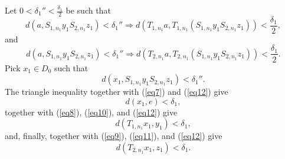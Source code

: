 \documentclass[12pt,a4paper]{amsart}
\theoremstyle{plain}
\theoremstyle{definition}
\theoremstyle{remark}
\theoremstyle{fact}
\begin{document}
    Let $0<\delta_1'' < \frac{\delta_1}{2}$ be such that
    \begin{equation}\label{eq10}
        d(a,S_{1,n_1}y_1S_{2,n_1}z_1)<\delta_1'' \Rightarrow d(T_{1,n_1}a,T_{1,n_1}(S_{1,n_1}y_1S_{2,n_1}z_1))<\frac{\delta_1}{2}, 
    \end{equation}
    and
    \begin{equation}\label{eq11}
        d(a,S_{1,n_1}y_1S_{2,n_1}z_1)<\delta_1'' \Rightarrow d(T_{2,n_1}a,T_{2,n_1}(S_{1,n_1}y_1S_{2,n_1}z_1))<\frac{\delta_1}{2}. 
    \end{equation}
    Pick $x_1\in D_0$ such that
    \begin{equation}\label{eq12}
        d(x_1,S_{1, n_1}y_1S_{2, n_1}z_1)<\delta_1''.
    \end{equation}
    The triangle inequality together with (\ref{eq7}) and (\ref{eq12}) give
    $$
        d(x_1,e)<\delta_1,
    $$
    together with (\ref{eq8}), (\ref{eq10}), and (\ref{eq12}) give
    $$
        d(T_{1, n_1}x_1,y_1)<\delta_1,
    $$
    and, finally, together with (\ref{eq9}), (\ref{eq11}), and (\ref{eq12}) give 
    $$
        d(T_{2, n_1}x_1,z_1)<\delta_1.
    $$
   
\end{document}
